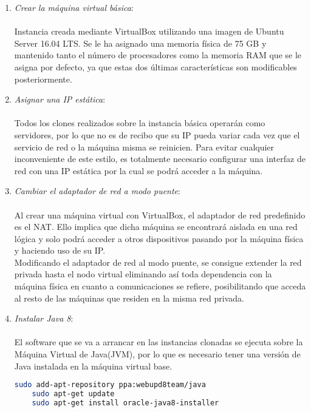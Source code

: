 \begin{enumerate}
	
	\item \textit{Crear la máquina virtual básica}:\\\\Instancia creada mediante VirtualBox utilizando una imagen de Ubuntu Server 16.04 LTS. Se le ha asignado una memoria física de 75 GB y mantenido tanto el número de procesadores como la memoria RAM que se le asigna por defecto, ya que estas dos últimas características son modificables posteriormente.\\ 
	
	\item \textit{Asignar una IP estática}:\\\\Todos los clones realizados sobre la instancia básica operarán como servidores, por lo que no es de recibo que su IP pueda variar cada vez que el servicio de red o la máquina misma se reinicien. Para evitar cualquier inconveniente de este estilo, es totalmente necesario configurar una interfaz de red con una IP estática por la cual se podrá acceder a la máquina.\\
	
	\item \textit{Cambiar el adaptador de red a modo puente}:\\\\Al crear una máquina virtual con VirtualBox, el adaptador de red predefinido es el NAT. Ello implica que dicha máquina se encontrará aislada en una red lógica y solo podrá acceder a otros dispositivos pasando por la máquina física y haciendo uso de su IP.\\
	Modificando el adaptador de red al modo puente, se consigue extender la red privada hasta el nodo virtual eliminando así toda dependencia con la máquina física en cuanto a comunicaciones se refiere, posibilitando que acceda al resto de las máquinas que residen en la misma red privada.\\
	
	\item \textit{Instalar Java 8}:\\\\El software que se va a arrancar en las instancias clonadas se ejecuta sobre la Máquina Virtual de Java(JVM), por lo que es necesario tener una versión de Java instalada en la máquina virtual base.\\
	
	\begin{lstlisting}[language=bash]
	sudo add-apt-repository ppa:webupd8team/java
	sudo apt-get update
	sudo apt-get install oracle-java8-installer
	\end{lstlisting}
	

\end{enumerate}
